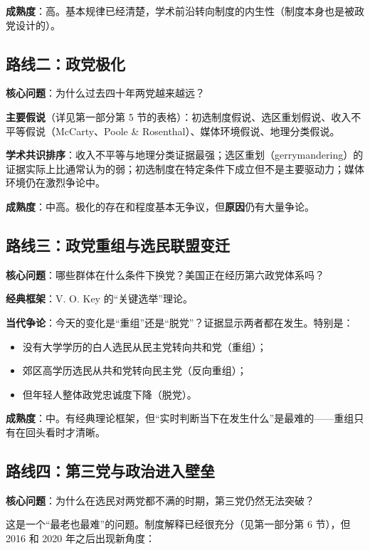 \documentclass[12pt,a4paper]{ctexart}
\begin{document}
\textbf{成熟度}：高。基本规律已经清楚，学术前沿转向制度的内生性（制度本身也是被政党设计的）。

\subsection{路线二：政党极化}

\textbf{核心问题}：为什么过去四十年两党越来越远？

\textbf{主要假说}（详见第一部分第 5 节的表格）：初选制度假说、选区重划假说、收入不平等假说（McCarty、Poole \& Rosenthal）、媒体环境假说、地理分类假说。

\textbf{学术共识排序}：收入不平等与地理分类证据最强；选区重划（gerrymandering）的证据实际上比通常认为的弱；初选制度在特定条件下成立但不是主要驱动力；媒体环境仍在激烈争论中。

\textbf{成熟度}：中高。极化的存在和程度基本无争议，但\textbf{原因}仍有大量争论。

\subsection{路线三：政党重组与选民联盟变迁}

\textbf{核心问题}：哪些群体在什么条件下换党？美国正在经历第六政党体系吗？

\textbf{经典框架}：V. O. Key 的``关键选举''理论。

\textbf{当代争论}：今天的变化是``重组''还是``脱党''？证据显示两者都在发生。特别是：

\begin{itemize}
  \item 没有大学学历的白人选民从民主党转向共和党（重组）；
  \item 郊区高学历选民从共和党转向民主党（反向重组）；
  \item 但年轻人整体政党忠诚度下降（脱党）。
\end{itemize}

\textbf{成熟度}：中。有经典理论框架，但``实时判断当下在发生什么''是最难的——重组只有在回头看时才清晰。

\subsection{路线四：第三党与政治进入壁垒}

\textbf{核心问题}：为什么在选民对两党都不满的时期，第三党仍然无法突破？

这是一个``最老也最难''的问题。制度解释已经很充分（见第一部分第 6 节），但 2016 和 2020 年之后出现新角度：
\end{document}
